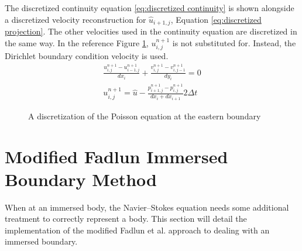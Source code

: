 \documentclass[onehalf,11pt]{beavtex}
\begin{document}
The discretized continuity equation \eqref{eq:discretized continuity} is shown alongside a discretized velocity reconstruction for $\hat{u}_{i+1,j}$, Equation \eqref{eq:discretized projection}. 
The other velocities used in the continuity equation are discretized in the same way. 
In the reference Figure \ref{fig:ID poisson}, $u_{i,j}^{n+1}$ is not substituted for.
Instead, the Dirichlet boundary condition velocity is used.
\begin{align}
\frac{u_{i,j}^{n+1} - u_{i-1,j}^{n+1}}{dx_i} + \frac{v_{i,j}^{n+1} - v_{i,j-1}^{n+1}}{dy_i} = 0 \label{eq:discretized continuity} \\
u_{i,j}^{n+1} = \hat{u} - \frac{p_{i+1,j}^{n+1} - p_{i,j}^{n+1}}{dx_i + dx_{i+1}}2\Delta t \; \label{eq:discretized projection}
\end{align}
\begin{figure}
	\centering
	
	\caption{A discretization of the Poisson equation at the eastern boundary}
	\label{fig:ID poisson}
\end{figure}

\section{Modified Fadlun Immersed Boundary Method}
\label{sec:ID fadlun}
\label{sec:modified fadlun}
When at an immersed body, the Navier--Stokes equation needs some additional treatment to correctly represent a body. 
This section will detail the implementation of the modified Fadlun et al\cite{Fadlun:2000fl}. approach to dealing with an immersed boundary.
\end{document}
